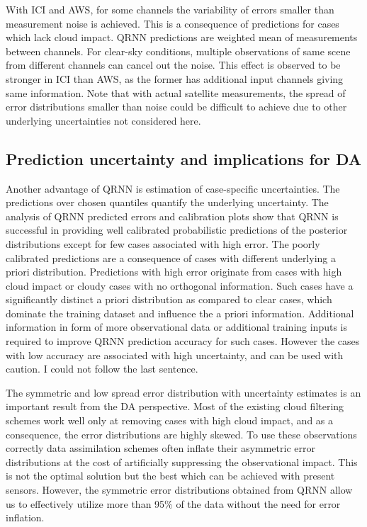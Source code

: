 \documentclass[amt, manuscript]{copernicus}
\newcommand{\todo}[1]{{\color{red} #1}}
\begin{document}
With ICI and AWS, for some channels the variability of errors smaller than measurement noise is achieved. This is a consequence of predictions for cases which lack cloud impact. QRNN predictions are weighted mean of measurements between channels. For clear-sky conditions, multiple observations of same scene from different channels can cancel out the noise. This effect is observed to be stronger in ICI than AWS, as the former has additional input channels giving same information. Note that with actual satellite measurements, the spread of error distributions smaller than noise could be difficult to achieve due to other underlying uncertainties not considered here. 


\subsection{Prediction uncertainty and implications for DA}

Another advantage of QRNN is estimation of case-specific uncertainties. The predictions over chosen quantiles quantify the underlying uncertainty. The analysis of QRNN predicted errors and calibration plots show that QRNN is successful in providing well calibrated probabilistic predictions of the posterior distributions except for few cases associated with high error. The poorly calibrated predictions are a consequence of cases with different underlying a priori distribution. Predictions with high error originate from cases with high cloud impact or cloudy cases with no orthogonal information. Such cases have a significantly distinct a priori distribution as compared to clear cases, which dominate the training dataset and influence the a priori information. Additional information in form of more observational data or additional training inputs is required to improve QRNN prediction accuracy for such cases. However the cases with low accuracy are associated with high uncertainty, and can be used with caution.  
\todo{I could not follow the last sentence.}

The symmetric and low spread error distribution with uncertainty estimates is an important result from the DA perspective. Most of the existing cloud filtering schemes work well only at removing cases with high cloud impact, and as a consequence, the error distributions are highly skewed. To use these observations correctly data assimilation schemes often inflate their asymmetric error distributions at the cost of artificially suppressing the observational impact. This is not the optimal solution but the best which can be achieved with present sensors. However, the symmetric error distributions obtained from QRNN allow us to effectively utilize more than 95\% of the data without the need for error inflation. 
\end{document}
